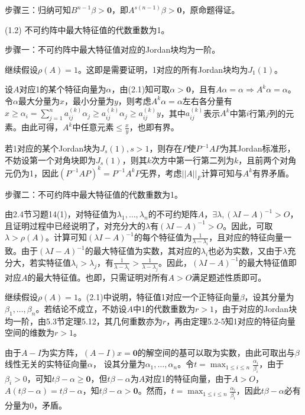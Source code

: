 \documentclass[a4paper,UTF8,fontset=windows]{ctexart}
\begin{document}
\begin{enumerate}
步骤三：归纳可知$B^{n-1}\beta>\mathbf{0}$，即$A^{s(n-1)}\beta>\mathbf{0}$，原命题得证。

(1.2) 不可约阵中最大特征值的代数重数为1。

步骤一：不可约阵中最大特征值对应的Jordan块均为一阶。

继续假设$\rho(A)=1$。这即是需要证明，1对应的所有Jordan块均为$J_1(1)$。

设$A$对应1的某个特征向量为$\alpha$，由(2.1)知可取$\alpha>\mathbf{0}$，且有$A\alpha=\alpha\Rightarrow A^k\alpha=\alpha$。令$\alpha$最大分量为$x$，最小分量为$y$，则考虑$A^k\alpha=\alpha$左右各分量有$x\ge\alpha_i=\sum_{j=1}^{n}{a_{ij}^{(k)}\alpha_j}\ge a_{ij}^{(k)}\alpha_j\ge a_{ij}^{(k)}y$，其中$a_{ij}^{(k)}$表示$A^k$中第$i$行第$j$列的元素。由此可得，$A^k$中任意元素$\le\frac{x}{y}$，也即有界。

若1对应的某个Jordan块为$J_s(1),s>1$，则存在$P$使$P^{-1}AP$为其Jordan标准形，不妨设第一个对角块即为$J_s(1)$，则其$k$次方中第一行第二列为$k$，且前两个对角元仍为1，因此$(P^{-1}AP)^k=P^{-1}A^kP$无界，考虑$||A||_F$计算可知与$A^k$有界矛盾。

步骤二：不可约阵中最大特征值的代数重数为1。

由2.4节习题14(1)，对特征值为$\lambda_1,\dots,\lambda_n$的不可约矩阵$A$，$\exists\lambda,(\lambda I-A)^{-1}>O$，且证明过程中已经说明了，对充分大的$\lambda$有$(\lambda I-A)^{-1}>O$。因此，可取$\lambda>\rho(A)$。计算可知$(\lambda I-A)^{-1}$的每个特征值为$\frac{1}{\lambda-\lambda_i}$，且对应的特征向量一致。由于$(\lambda I-A)^{-1}$的最大特征值为实数，其对应的$\lambda_i$也必为实数，又由于$\lambda$充分大，若实特征值$\lambda_i>\lambda_j$，有$\frac{1}{\lambda-\lambda_i}>\frac{1}{\lambda-\lambda_j}$。因此，$(\lambda I-A)^{-1}$的最大特征值即对应$A$的最大特征值。也即，只需证明对所有$A>O$满足题述性质即可。

继续假设$\rho(A)=1$。(2.1)中说明，特征值1对应一个正特征向量$\beta$，设其分量为$\beta_1,\dots,\beta_n$。若结论不成立，不妨设$A$中1的代数重数为$r>1$，由于对应的Jordan块均一阶，由5.3节定理5.12，其几何重数亦为$r$，再由定理5.2-5知1对应的特征向量空间的维数为$r>1$。

由于$A-I$为实方阵，$(A-I)x=\mathbf{0}$的解空间的基可以取为实数，由此可取出与$\beta$线性无关的实特征向量$\alpha$， 设其分量为$\alpha_1,\dots,\alpha_n$。令$t=\max_{1\le i\le n}{\frac{\alpha_i}{\beta_i}}$，由于$\beta_i>0$，可知$t\beta-\alpha\ge\mathbf{0}$，但$t\beta-\alpha$为$A$对应1的特征向量，由于$A>O$，$A(t\beta-\alpha)=t\beta-\alpha$，知$t\beta-\alpha>\mathbf{0}$。然而，$t=\max_{1\le i\le n}{\frac{\alpha_i}{\beta_i}}$，因此$t\beta-\alpha$必有分量为0，矛盾。


\end{enumerate}
\end{document}
